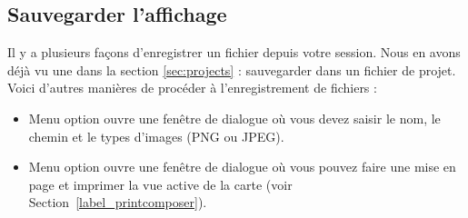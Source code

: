 
\subsection{Sauvegarder l'affichage}\label{sec:output}
Il y a plusieurs fa\c{c}ons d'enregistrer un fichier depuis votre session. Nous en avons d\'ej\`a vu une dans la section \ref{sec:projects} : sauvegarder dans un fichier de projet.
Voici d'autres mani\`eres de proc\'eder \`a l'enregistrement de fichiers :
\begin{itemize}
\item Menu option  ouvre une fen\^etre de dialogue o\`u vous devez saisir le nom, le chemin et le types d'images (PNG ou JPEG).
\item Menu option  ouvre une fen\^etre de dialogue o\`u vous pouvez faire une mise en page et imprimer la vue active de la carte (voir Section~\ref{label_printcomposer}).
\end{itemize}


